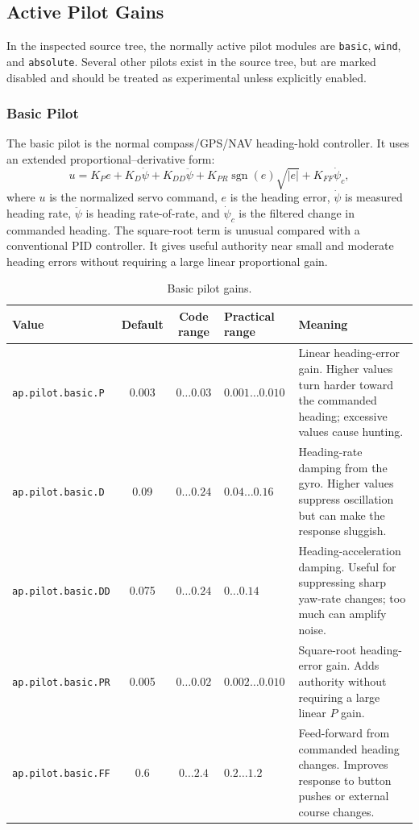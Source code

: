 \documentclass[11pt,twocolumn]{article}
\newcommand{\abs}[1]{\left\lvert #1 \right\rvert}
\begin{document}
\subsection{Active Pilot Gains}
In the inspected source tree, the normally active pilot modules are
\texttt{basic}, \texttt{wind}, and \texttt{absolute}.  Several other
pilots exist in the source tree, but are marked disabled and should be
treated as experimental unless explicitly enabled.
\subsubsection{Basic Pilot}
The basic pilot is the normal compass/GPS/NAV heading-hold controller.  It
uses an extended proportional--derivative form:
\[
u
=
K_P e
+
K_D \dot{\psi}
+
K_{DD} \ddot{\psi}
+
K_{PR}\operatorname{sgn}(e)\sqrt{\abs{e}}
+
K_{FF}\dot{\psi}_c ,
\]
where \(u\) is the normalized servo command, \(e\) is the heading error,
\(\dot{\psi}\) is measured heading rate, \(\ddot{\psi}\) is heading
rate-of-rate, and \(\dot{\psi}_c\) is the filtered change in commanded
heading.  The square-root term is unusual compared with a conventional PID
controller.  It gives useful authority near small and moderate heading
errors without requiring a large linear proportional gain.
\begin{table}[t]
\centering
\caption{Basic pilot gains.}
\label{tab:pypilot-basic-gains}
\begin{tabularx}{\textwidth}{Z{0.23\textwidth}c c Z{0.16\textwidth}Y}
\toprule
Value & Default & Code range & Practical range & Meaning \\
\midrule
\texttt{ap.pilot.basic.P} &
\num{0.003} &
\(\num{0}\ldots\num{0.03}\) &
\(\num{0.001}\ldots\num{0.010}\) &
Linear heading-error gain.  Higher values turn harder toward the commanded heading; excessive values cause hunting. \\
\texttt{ap.pilot.basic.D} &
\num{0.09} &
\(\num{0}\ldots\num{0.24}\) &
\(\num{0.04}\ldots\num{0.16}\) &
Heading-rate damping from the gyro.  Higher values suppress oscillation but can make the response sluggish. \\
\texttt{ap.pilot.basic.DD} &
\num{0.075} &
\(\num{0}\ldots\num{0.24}\) &
\(\num{0}\ldots\num{0.14}\) &
Heading-acceleration damping.  Useful for suppressing sharp yaw-rate changes; too much can amplify noise. \\
\texttt{ap.pilot.basic.PR} &
\num{0.005} &
\(\num{0}\ldots\num{0.02}\) &
\(\num{0.002}\ldots\num{0.010}\) &
Square-root heading-error gain.  Adds authority without requiring a large linear \(P\) gain. \\
\texttt{ap.pilot.basic.FF} &
\num{0.6} &
\(\num{0}\ldots\num{2.4}\) &
\(\num{0.2}\ldots\num{1.2}\) &
Feed-forward from commanded heading changes.  Improves response to button pushes or external course changes. \\
\bottomrule
\end{tabularx}
\end{table}
\end{document}

